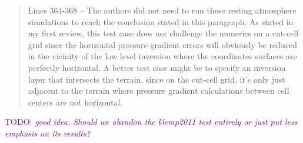 \documentclass{article}
\newcommand{\TODO}[1]{\textcolor{purple}{TODO: \emph{#1}}}
\begin{document}
\begin{quotation}
 Lines 364-368 – The authors did not need to run these resting atmosphere 
 simulations to reach the conclusion stated in this paragraph. As stated in my first 
 review, this test case does not challenge the numerics on a cut-cell grid since the horizontal pressure-gradient errors will obviously be reduced in the vicinity of the 
 low level inversion where the coordinates surfaces are perfectly horizontal. A better 
 test case might be to specify an inversion layer that intersects the terrain, since on 
 the cut-cell grid, it's only just adjacent to the terrain where pressure gradient 
 calculations between cell centers are not horizontal.   
\end{quotation}
\TODO{good idea.  Should we abandon the klemp2011 test entirely or just put less emphasis on its results?}
\end{document}
